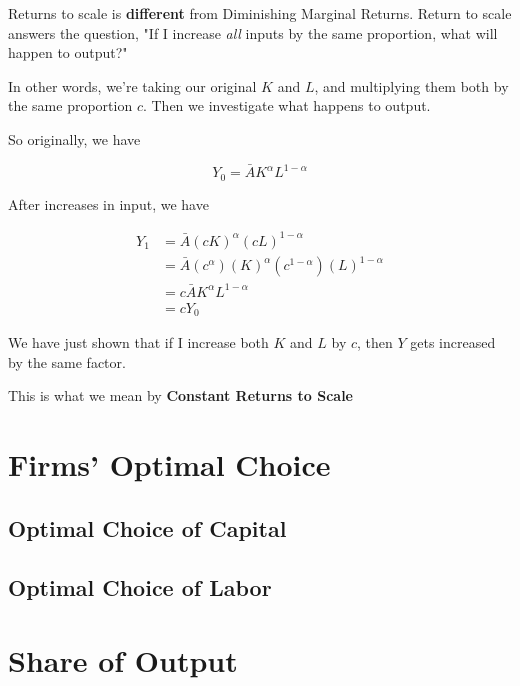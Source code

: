 \documentclass[11pt]{scrartcl}
\begin{document}
Returns to scale is \textbf{different} from Diminishing Marginal Returns. Return to scale answers the question, "If I increase \emph{all} inputs by the same proportion, what will happen to output?"

In other words, we're taking our original $K$ and $L$, and multiplying them both by the same proportion $c$. Then we investigate what happens to output.

So originally, we have

\[Y_0 = \bar{A} K^\alpha L^{1-\alpha} \]

After increases in input, we have

\begin{align*}
Y_1 &= \bar{A} (cK)^\alpha (cL)^{1-\alpha} \\
&= \bar{A} (c^\alpha)(K)^\alpha (c^{1-\alpha})(L)^{1-\alpha} \\
&= c\bar{A} K^\alpha L^{1-\alpha} \\
&= cY_0
\end{align*}

We have just shown that if I increase both $K$ and $L$ by $c$, then $Y$ gets increased by the same factor.

This is what we mean by \textbf{Constant Returns to Scale}

\section{Firms' Optimal Choice}

\subsection{Optimal Choice of Capital}

\subsection{Optimal Choice of Labor}

\section{Share of Output}
\end{document}
